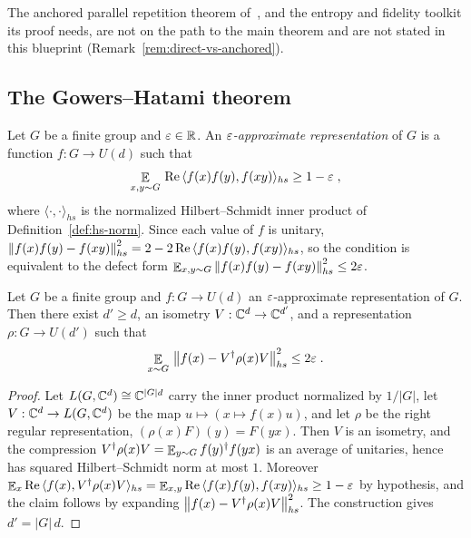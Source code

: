 \noindent The anchored parallel repetition theorem of~\cite{BVY17}, and the entropy and
fidelity toolkit its proof needs, are not on the path to the main theorem and are not
stated in this blueprint (Remark~\ref{rem:direct-vs-anchored}).

\subsection{The Gowers--Hatami theorem}
\label{sec:rr-gowers-hatami}

\qlib

\begin{definition}
\label{def:approx-rep}
\leanok
\qlib{}
Let $G$ be a finite group and $\varepsilon \in \mathbb{R}$. An \emph{$\varepsilon$-approximate
representation} of $G$ is a function $f : G \to U(d)$ such that
\begin{equation*}
  \mathop{\mathbb{E}}_{x, y \sim G} \, \mathrm{Re}\, \langle f(x) f(y), f(xy) \rangle_{hs}
  \geq 1 - \varepsilon\;,
\end{equation*}
where $\langle \cdot, \cdot \rangle_{hs}$ is the normalized Hilbert--Schmidt
inner product of Definition~\ref{def:hs-norm}. Since each value of $f$ is
unitary, $\left\| {f(x) f(y) - f(xy)} \right\|_{hs}^2 = 2 - 2\, \mathrm{Re}\, \langle f(x)
f(y), f(xy) \rangle_{hs}$, so the condition is equivalent to the defect form
$\mathop{\mathbb{E}}_{x, y \sim G} \left\| {f(x) f(y) - f(xy)} \right\|_{hs}^2 \leq 2 \varepsilon$.
\end{definition}

\begin{theorem}
\label{thm:gowers-hatami}
\leanok
Let $G$ be a finite group and $f : G \to U(d)$ an $\varepsilon$-approximate
representation of $G$. Then there exist $d' \geq d$, an isometry
$V : \mathbb{C}^d \to \mathbb{C}^{d'}$, and a representation $\rho : G \to U(d')$ such that
\begin{equation*}
  \mathop{\mathbb{E}}_{x \sim G} \, \left\| {f(x) - V^\dagger \rho(x) V} \right\|_{hs}^2 \leq 2 \varepsilon\;.
\end{equation*}
\end{theorem}

\begin{proof}
\leanok
Let $L(G, \mathbb{C}^d) \cong \mathbb{C}^{|G| d}$ carry the inner product normalized by $1/|G|$,
let $V : \mathbb{C}^d \to L(G, \mathbb{C}^d)$ be the map $u \mapsto (x \mapsto f(x) u)$, and let
$\rho$ be the right regular representation, $(\rho(x) F)(y) = F(yx)$. Then $V$ is
an isometry, and the compression $V^\dagger \rho(x) V = \mathop{\mathbb{E}}_{y \sim G}
f(y)^\dagger f(yx)$ is an average of unitaries, hence has squared
Hilbert--Schmidt norm at most $1$. Moreover
$\mathop{\mathbb{E}}_{x} \mathrm{Re}\, \langle f(x), V^\dagger \rho(x) V \rangle_{hs} =
\mathop{\mathbb{E}}_{x, y} \mathrm{Re}\, \langle f(x) f(y), f(xy) \rangle_{hs} \geq 1 - \varepsilon$ by
hypothesis, and the claim follows by expanding
$\left\| {f(x) - V^\dagger \rho(x) V} \right\|_{hs}^2$. The construction gives
$d' = |G|\, d$.
\end{proof}

